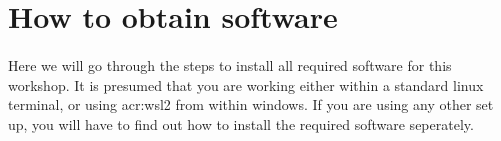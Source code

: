 \section{How to obtain software}
    \paragraph{}
    Here we will go through the steps to install all required software for this workshop. It is presumed that you are working either within a standard linux terminal, or using \gls{acr:wsl2} from within windows. If you are using any other set up, you will have to find out how to install the required software seperately.




